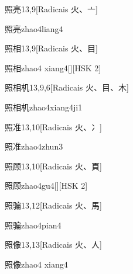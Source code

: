 \begin{entry}{照亮}{13,9}[Radicais ⽕、⼇]
  \begin{phonetics}{照亮}{zhao4liang4}
  \end{phonetics}
\end{entry}

\begin{entry}{照相}{13,9}[Radicais ⽕、⽬]
  \begin{phonetics}{照相}{zhao4 xiang4}[][HSK 2]
  \end{phonetics}
\end{entry}

\begin{entry}{照相机}{13,9,6}[Radicais ⽕、⽬、⽊]
  \begin{phonetics}{照相机}{zhao4xiang4ji1}
  \end{phonetics}
\end{entry}

\begin{entry}{照准}{13,10}[Radicais ⽕、⼎]
  \begin{phonetics}{照准}{zhao4zhun3}
  \end{phonetics}
\end{entry}

\begin{entry}{照顾}{13,10}[Radicais ⽕、⾴]
  \begin{phonetics}{照顾}{zhao4gu4}[][HSK 2]
  \end{phonetics}
\end{entry}

\begin{entry}{照骗}{13,12}[Radicais ⽕、⾺]
  \begin{phonetics}{照骗}{zhao4pian4}
  \end{phonetics}
\end{entry}

\begin{entry}{照像}{13,13}[Radicais ⽕、⼈]
  \begin{phonetics}{照像}{zhao4 xiang4}
  \end{phonetics}
\end{entry}

